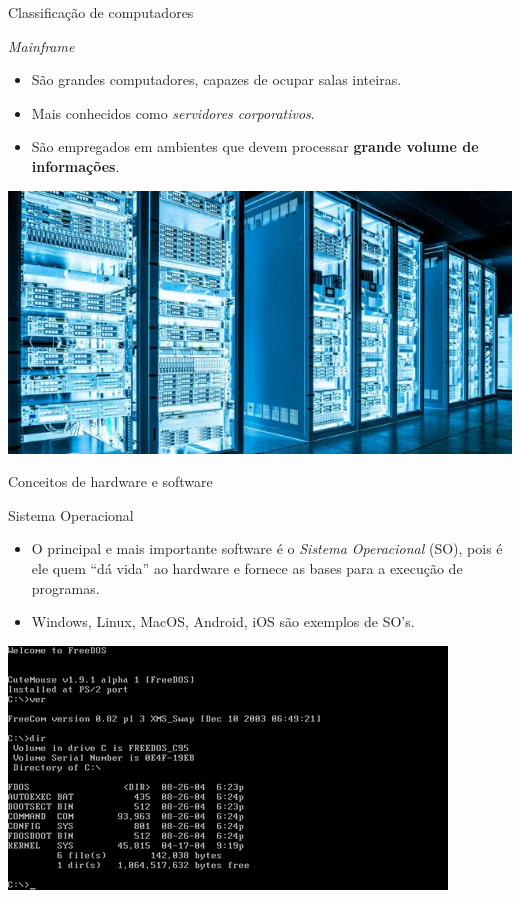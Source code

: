 \begin{frame}{Classificação de computadores}
	\begin{block}{\textit{Mainframe}}
		\begin{itemize}
			\item São grandes computadores, capazes de ocupar salas inteiras.
			\item Mais conhecidos como \textit{servidores corporativos}.
			\item São empregados em ambientes que devem processar \textbf{grande volume de
				      informações}.
		\end{itemize}
	\end{block}

	\centering
	\includegraphics[width=0.7\linewidth]{Figuras/Ch01/fig5.1}
\end{frame}


\begin{frame}{Conceitos de hardware e software}
	\begin{block}{Sistema Operacional}
		\begin{itemize}
			\item O principal e mais importante software é o \textit{Sistema
				      Operacional} (SO), pois é ele quem “dá vida” ao hardware e
			      fornece as bases para a execução de programas.
			\item Windows, Linux, MacOS, Android, iOS são exemplos de
			      SO's.
		\end{itemize}
	\end{block}

	\centering
	\includegraphics[width=0.7\linewidth]{Figuras/Ch01/fig36}
\end{frame}



